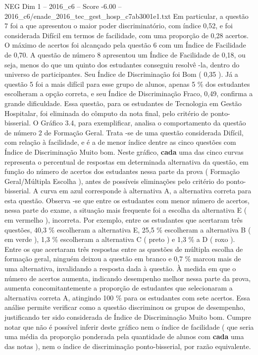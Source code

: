\begin{textsample}{NEG Dim 1 – 2016\_c6 – Score -6.00 – 2016\_c6/enade\_2016\_tec\_gest\_hosp\_c7ab3001e1.txt}
Em particular, a questão 7 foi a que apresentou o maior poder discriminatório, com índice 0,52, e foi considerada Difícil em termos de facilidade, com uma proporção de 0,28 acertos.
O máximo de acertos foi alcançado pela questão 6 com um Índice de Facilidade de 0,70.
A questão de número 8 apresentou um Índice de Facilidade de 0,18, ou seja, menos do que um quinto dos estudantes conseguiu resolvê -la, dentro do universo de participantes.
Seu Índice de Discriminação foi Bom ( 0,35 ).
Já a questão 5 foi a mais difícil para esse grupo de alunos, apenas 5 \% dos estudantes escolheram a opção correta, e seu Índice de Discriminação Fraco, 0,49, confirma a grande dificuldade.
Essa questão, para os estudantes de Tecnologia em Gestão Hospitalar, foi eliminada do cômputo da nota final, pelo critério de ponto-bisserial.
O Gráfico 3.4, para exemplificar, analisa o comportamento da questão de número 2 de Formação Geral.
Trata -se de uma questão considerada Difícil, com relação à facilidade, e é a de menor índice dentre as cinco questões com Índice de Discriminação Muito bom.
Neste gráfico, \textbf{cada} uma das cinco curvas representa o percentual de respostas em determinada alternativa da questão, em função do número de acertos dos estudantes nessa parte da prova ( Formação Geral/Múltipla Escolha ), antes de possíveis eliminações pelo critério do ponto-bisserial.
A curva em azul corresponde à alternativa A, a alternativa correta para esta questão.
Observa -se que entre os estudantes com menor número de acertos, nessa parte do exame, a situação mais frequente foi a escolha da alternativa E ( em vermelho ), incorreta.
Por exemplo, entre os estudantes que acertaram três questões, 40,3 \% escolheram a alternativa E, 25,5 \% escolheram a alternativa B ( em verde ), 1,3 \% escolheram a alternativa C ( preto ) e 1,3 \% a D ( roxo ).
Entre os que acertaram três respostas entre as questões de múltipla escolha de formação geral, ninguém deixou a questão em branco e 0,7 \% marcou mais de uma alternativa, invalidando a resposta dada à questão.
À medida em que o número de acertos aumenta, indicando desempenho melhor nessa parte da prova, aumenta concomitantemente a proporção de estudantes que selecionaram a alternativa correta A, atingindo 100 \% para os estudantes com sete acertos.
Essa análise permite verificar como a questão discriminou os grupos de desempenho, justificando ter sido considerada de Índice de Discriminação Muito bom.
Cumpre notar que não é possível inferir deste gráfico nem o índice de facilidade ( que seria uma média da proporção ponderada pela quantidade de alunos com \textbf{cada} uma das notas ), nem o índice de discriminação ponto-bisserial, por razão equivalente.

\end{textsample}
